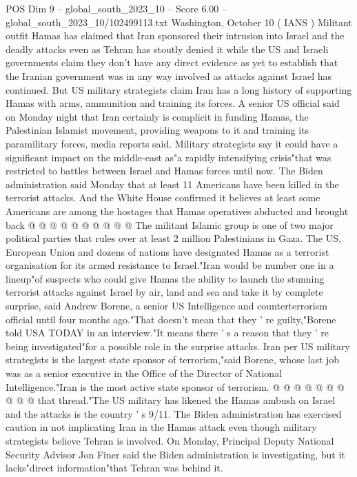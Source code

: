 \begin{textsample}{POS Dim 9 – global\_south\_2023\_10 – Score 6.00 – global\_south\_2023\_10/102499113.txt}  \label{ex:f9_pos_037}
Washington, October 10 ( IANS ) Militant outfit Hamas has claimed that Iran sponsored their intrusion into Israel and the deadly attacks even as Tehran has stoutly denied it while the US and Israeli governments claim they don't have any direct evidence as yet to establish that the Iranian government was in any way involved as attacks against Israel has continued.
But US military strategists claim Iran has a long history of supporting Hamas with arms, ammunition and training its forces.
A senior US official said on Monday night that Iran certainly is complicit in funding Hamas, the Palestinian Islamist movement, providing weapons to it and training its paramilitary forces, media reports said.
Military strategists say it could have a significant impact on the middle-east as"a rapidly intensifying crisis"that was restricted to battles between Israel and Hamas forces until now.
The Biden administration said Monday that at least 11 Americans have been killed in the terrorist attacks.
And the White House confirmed it believes at least some Americans are among the hostages that Hamas operatives abducted and brought back @ @ @ @ @ @ @ @ @ @ The militant Islamic group is one of two major political parties that rules over at least 2 million Palestinians in Gaza.
The US, European Union and dozens of nations have designated Hamas as a terrorist organisation for its armed resistance to Israel."Iran would be number one in a lineup"of suspects who could give Hamas the ability to launch the stunning terrorist attacks against Israel by air, land and sea and take it by complete surprise, said Andrew Borene, a senior US Intelligence and counterterrorism official until four months ago."That doesn't mean that they ' re guilty,"Borene told USA TODAY in an interview."It means there ' s a reason that they ' re being investigated"for a possible role in the surprise attacks.
Iran per US military strategists is the largest state sponsor of terrorism,"said Borene, whose last job was as a senior executive in the Office of the Director of National Intelligence."Iran is the most active state sponsor of terrorism. @ @ @ @ @ @ @ @ @ @ that thread."The US military has likened the Hamas ambush on Israel and the attacks is the country ' s 9/11.
The Biden administration has exercised caution in not implicating Iran in the Hamas attack even though military strategists believe Tehran is involved.
On Monday, Principal Deputy National Security Advisor Jon Finer said the Biden administration is investigating, but it lacks"direct information"that Tehran was behind it.

\end{textsample}
